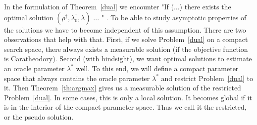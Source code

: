 In the formulation of Theorem~\ref{dual} we encounter "If (...) there exists the optimal solution $(\rho^\dagger,\lambda_0^\dagger,\lambda)$ ... " .
To be able to study asymptotic properties of the solutions we have to become independent of this assumption.
There are two observations that help with that.
First, if we solve Problem~\ref{dual} on a compact search space, there always exists a measurable solution (if the objective function is Caratheodory).
Second (with hindsight), we want optimal solutions to estimate an oracle parameter $\lambda^*$ well. 
To this end, we will define a compact parameter space that always contains the oracle parameter $\lambda^*$ and restrict Problem~\ref{dual} to it.
Then Theorem~\ref{th:argmax} gives us a measurable solution of the restricted Problem~\ref{dual}.
In some cases, this is only a local solution. It becomes global if it is in the interior of the compact parameter space.
Thus we call it the restricted, or the pseudo solution.

